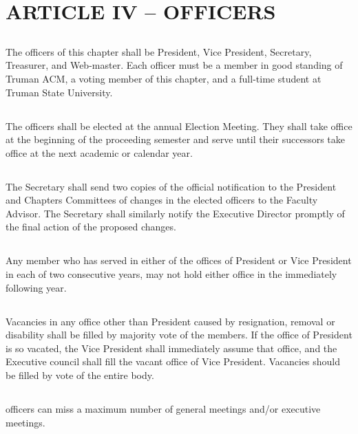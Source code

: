 \documentclass[12pt]{article}
\begin{document}
\section{ARTICLE IV – OFFICERS}
\subsection{}	The officers of this chapter shall be President, Vice President, Secretary, Treasurer, and Web-master. Each officer must be a member in good standing of Truman ACM, a voting member of this chapter, and a full-time student at Truman State University.
\subsection{}	The officers shall be elected at the annual Election Meeting. They shall take office at the beginning of the proceeding semester and serve until their successors take office at the next academic or calendar year.
\subsection{}	The Secretary shall send two copies of the official notification to the President and Chapters Committees of changes in the elected officers to the Faculty Advisor. The Secretary shall similarly notify the Executive Director promptly of the final action of the proposed changes.
\subsection{}	Any member who has served in either of the offices of President or Vice President in each of two consecutive years, may not hold either office in the immediately following year.
\subsection{}	Vacancies in any office other than President caused by resignation, removal or disability shall be filled by majority vote of the members. If the office of President is so vacated, the Vice President shall immediately assume that office, and the Executive council shall fill the vacant office of Vice President. Vacancies should be filled by vote of the entire body.
\subsection{} officers can miss a maximum number of general meetings and/or executive meetings.
\end{document}
